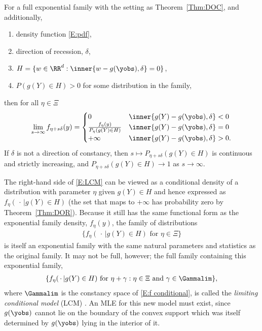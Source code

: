 \begin{theorem} \label{Thm:LCM}
For a full exponential family with the setting as Theorem~\ref{Thm:DOC}, and 
additionally,
\begin{enumerate}
\item density function \eqref{E:pdf},
\item direction of recession, $\delta$,
\item $H = \{ w \in \RR^d: \inner{ w-g(\yobs), \delta } = 0 \}$,
\item $P( g(Y) \in H) > 0$ for some distribution in the family,
\end{enumerate}
then for all $\eta \in \Xi$
\begin{align} \label{E:LCM}
\lim_{s \to \infty} f_{\eta+s\delta}(y) = 
			\begin{cases} 
			0 								& \inner{g(Y) - g(\yobs), \delta} < 0 \\
			\frac{f_\eta(y)}{P_\eta(g(Y) \in H)} 	& \inner{g(Y) - g(\yobs),
\delta} = 0 \\
			+\infty							& \inner{g(Y) - g(\yobs), \delta} > 0.
		\end{cases}
\end{align}
If $\delta$ is not a direction of constancy, then $s \mapsto P_{\eta+s\delta}( g(Y) 
\in H)$ is continuous and strictly increasing, and 
$P_{\eta+s\delta}( g(Y) \in H) \to 
1$ as $s \to \infty$.
\end{theorem}


The right-hand side of \eqref{E:LCM} can be viewed as a conditional density of a 
distribution with parameter $\eta$ given $g(Y) \in H$ and hence expressed as $f_{\eta}
(\, \cdot\,  | g(Y) \in H)$ (the set that maps to $+\infty$ has probability zero by 
Theorem~\ref{Thm:DOR}).  Because it still has the same functional form as the 
exponential family density, $f_\eta(y)$, the family of distributions
\begin{align} \label{E:f conditional}
\{ f_{\eta}(\, \cdot\,  | g(Y) \in H) \text{ for } \eta \in \Xi \}
\end{align}
is itself an exponential family with the same natural parameters and statistics as the 
original family.  
It may not be full, however; the full family containing this exponential family,
\begin{align*}
\{ f_{\eta}(\, \cdot\,  | g(Y) \in H) \text{ for }  \eta + \gamma: \eta \in \Xi \text
{ and } \gamma \in \Gammalim \},
\end{align*}
where $\Gammalim$ is the constancy space of \eqref{E:f conditional},
is called the \emph{limiting conditional model} (LCM) \citep{Geyer:gdor}.  
An MLE for this new model must exist, since $g(\yobs)$ cannot lie on the boundary of 
the convex support which was itself determined by $g(\yobs)$ lying in the interior of 
it.  


